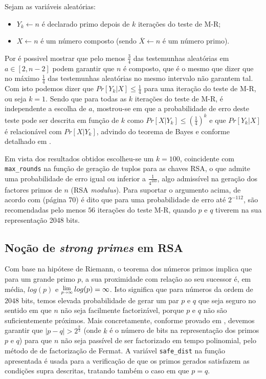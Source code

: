 \documentclass[dvipsnames]{article}
\newcommand{\Lim}[1]{\raisebox{0.5ex}{\scalebox{0.8}{$\displaystyle \lim_{#1}\;$}}}
\begin{document}
\begin{multicols}{2}
  \noindent Sejam as variáveis aleatórias:
  
  \begin{itemize}
    \item $Y_k \leftarrow n$ é declarado primo depois de $k$ iterações do teste de M-R;
    \item $X \leftarrow n$ é um número composto (sendo $\overline{X} \leftarrow n$ é um número primo).
  \end{itemize}
  
  
  \noindent Por \cite{DBLP:journals/dcc/Lenstra00} é possivel mostrar que pelo menos $\frac{3}{4}$ das testemunhas aleatórias em $a \in [2,n-2]$ podem garantir que $n$ é composto, que é o mesmo que dizer que no máximo $\frac{1}{4}$ das testemunhas aleatórias no mesmo intervalo não garantem tal. Com isto podemos dizer que $Pr[Y_k|X] \leq \frac{1}{4}$ para uma iteração do teste de M-R, ou seja $k=1$. Sendo que para todas as $k$ iterações do teste de M-R, é independente a escolha de $a$, mostrou-se em \cite{1204.1657v2} que a probabilidade de erro deste teste pode ser descrita em função de $k$ como $Pr[X|Y_k] \leq (\frac{1}{4})^k$ e que $Pr[Y_k|X]$ é relacionável com $Pr[X|Y_k]$, advindo do teorema de Bayes e conforme detalhado em \cite{1709.09963}.
  
  \vskip 0.4cm
  
  \noindent Em vista dos resultados obtidos escolheu-se um $k=100$, coincidente com \texttt{max\_rounds} na função de geração de tuplos para as chaves RSA, o que admite uma probabilidade de erro igual ou inferior a $\frac{1}{4^{100}}$, algo admissível na geração dos factores primos de $n$ (RSA \textit{modulus}). Para suportar o argumento acima, de acordo com \cite{FIPS} (página 70) é dito que para uma probabilidade de erro até $2^{-112}$, são recomendadas pelo menos $56$ iterações do teste M-R, quando $p$ e $q$ tiverem na sua representação 2048 bits.
  
  \subsection{Noção de \textit{strong primes} em RSA}
  
  Com base na hipótese de Riemann, o teorema dos números primos \cite{rh} implica que para um grande primo $p$, a sua proximidade com relação ao seu sucessor é, em média, $log(p)$ e $\Lim{p \rightarrow \infty}log(p) = \infty$. Isto significa que para números da ordem de $2048$ bits, temos elevada probabilidade de gerar um par $p$ e $q$ que seja seguro no sentido em que $n$ não seja facilmente factorizável, porque $p$ e $q$ não são suficientemente próximos. Mais concretamente, conforme provado em \cite{DBLP:journals/iacr/ErraG09}, devemos garantir que $|p-q| > 2^{\frac{k}{3}}$ (onde $k$ é o número de bits na representação dos primos $p$ e $q$) para que $n$ não seja passível de ser factorizado em tempo polinomial, pelo método de de factorização de Fermat. A variável \texttt{safe\_dist} na função apresentada é usada para a verificação de que os primos gerados satisfazem as condições supra descritas, tratando também o caso em que $p = q$.
  

\end{multicols}
\end{document}
